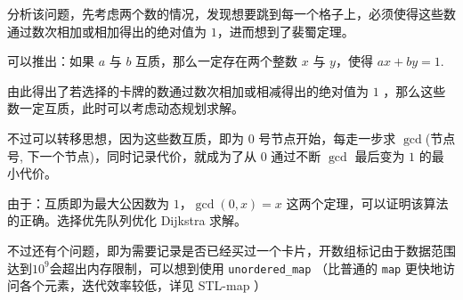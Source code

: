 分析该问题，先考虑两个数的情况，发现想要跳到每一个格子上，必须使得这些数通过数次相加或相加得出的绝对值为 $1$，进而想到了裴蜀定理。

可以推出：如果 $a$ 与 $b$ 互质，那么一定存在两个整数 $x$ 与 $y$，使得 $ax+by=1$.

由此得出了若选择的卡牌的数通过数次相加或相减得出的绝对值为 $1$ ，那么这些数一定互质，此时可以考虑动态规划求解。

不过可以转移思想，因为这些数互质，即为 $0$ 号节点开始，每走一步求 $\gcd$(节点号, 下一个节点)，同时记录代价，就成为了从 $0$ 通过不断 $\gcd$ 最后变为 $1$ 的最小代价。

由于：互质即为最大公因数为 $1$，$\gcd(0,x)=x$ 这两个定理，可以证明该算法的正确。选择优先队列优化 Dijkstra 求解。

不过还有个问题，即为需要记录是否已经买过一个卡片，开数组标记由于数据范围达到$10^9$会超出内存限制，可以想到使用 \texttt{unordered\_map} （比普通的 \texttt{map} 更快地访问各个元素，迭代效率较低，详见  STL-map ）
